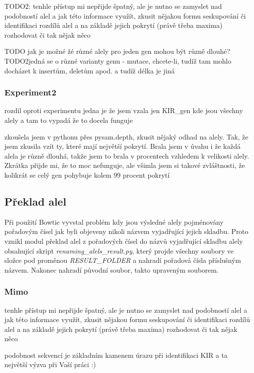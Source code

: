 \documentclass[czech,DP]{thesiskiv}
\numberwithin{equation}{section}
\begin{document}
TODO2: tenhle přístup mi nepřijde špatný, ale je nutno se zamyslet nad podobností alel a jak této informace využít, zkusit nějakou formu seskupování či identifikaci rozdílů alel a na základě jejich pokrytí (právě třeba maxima) rozhodovat či tak nějak něco

TODO jak je možné žé různé alely pro jeden gen mohou být různě dlouhé?
TODO2jedná se o různé varianty genu - mutace, chcete-li, tudíž tam mohlo docházet k insertům, deletům apod. a tudíž délka je jiná

\subsubsection{Experiment2}
rozdil oproti experimentu jedna je že jsem vzala jen KIR\_gen kde jsou všechny alely a tam to vypadá že to docela funguje



zkoušela jsem v pythonu přes pysam.depth, zkusit nějaký odhad na alely. Tak, že jsem zkusila vzít ty, které mají největší pokrytí. Brala jsem v úvahu i že každá alela je různě dlouhá, takže jsem to brala v procentech vzhledem k velikosti alely.  Zkrátka přijde mi, že to moc nefunguje, ale všimla jsem si takové zvláštnosti, že kolikrát se celý gen pohybuje kolem 99 procent pokrytí

\subsection{Překlad alel}
Při použití Bowtie vyvstal problém kdy jsou výsledné alely pojménovány pořadovým čísel jak byli objeveny nikoli názvem vyjadřující jejich skladbu. Proto vznikl modul překlad alel z pořadových čísel do názvů vyjadřující skladbu alely obsahující skript \textit{renaming\_alels\_result.py}, který projde všechny soubory ve složce pod proměnou \textit{RESULT\_FOLDER} a nahradí pořadová čísla příslušným názvem. Nakonec nahradí původní soubor, takto upraveným souborem.

\subsubsection{Mimo}
tenhle přístup mi nepřijde špatný, ale je nutno se zamyslet nad podobností alel a jak této informace využít, zkusit nějakou formu seskupování či identifikaci rozdílů alel a na základě jejich pokrytí (právě třeba maxima) rozhodovat či tak nějak něco


podobnost sekvencí je základním kamenem úrazu při identifikaci KIR a ta největší výzva při Vaší práci :)
\end{document}
